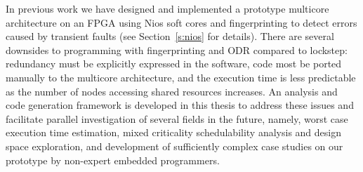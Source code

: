 % 
	
	In previous work we have designed and implemented a prototype multicore architecture on an FPGA using Nios soft cores and fingerprinting to detect errors caused by transient faults \cite{ugthesis} (see Section~\ref{s:nios} for details). 
	There are several downsides to programming with fingerprinting and ODR compared to lockstep: redundancy must be explicitly expressed in the software, code most be ported manually to the multicore architecture, and the execution time is less predictable as the number of nodes accessing shared resources increases. 
	An analysis and code generation framework is developed in this thesis to address these issues and facilitate parallel investigation of several fields in the future, namely, worst case execution time estimation, mixed criticality schedulability analysis and design space exploration, and development of sufficiently complex case studies on our prototype by non-expert embedded programmers.
	
